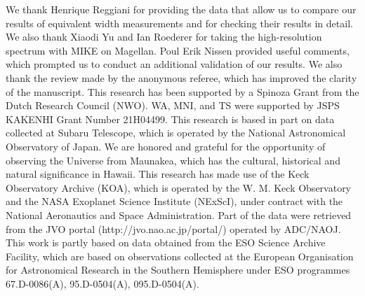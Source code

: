 \documentclass{aa}
\begin{document}
\begin{acknowledgements}

We thank Henrique Reggiani for providing the data that allow us to compare our results of equivalent width measurements and for checking their results in detail.
We also thank Xiaodi Yu and Ian Roederer for taking the high-resolution spectrum with MIKE on Magellan. 
Poul Erik Nissen provided useful comments, which prompted us to conduct an additional validation of our results.
We also thank the review made by the anonymous referee, which has improved the clarity of the manuscript.
This research has been supported by a Spinoza Grant from the Dutch Research Council (NWO).
WA, MNI, and TS were supported by JSPS KAKENHI Grant Number 21H04499.
This research is based in part on data collected at Subaru Telescope, which is operated by the National Astronomical Observatory of Japan.
We are honored and grateful for the opportunity of observing the Universe from Maunakea, which has the cultural, historical and natural significance in Hawaii.
This research has made use of the Keck Observatory Archive (KOA), which is operated by the W. M. Keck Observatory and the NASA Exoplanet Science Institute (NExScI), under contract with the National Aeronautics and Space Administration.
Part of the data were retrieved from the JVO portal (http://jvo.nao.ac.jp/portal/) operated by ADC/NAOJ.
This work is partly based on data obtained from the ESO Science Archive Facility, which are based on observations collected at the European Organisation for Astronomical Research in the Southern Hemisphere under ESO programmes 67.D-0086(A), 95.D-0504(A), 095.D-0504(A).

\end{acknowledgements}

\end{document}
